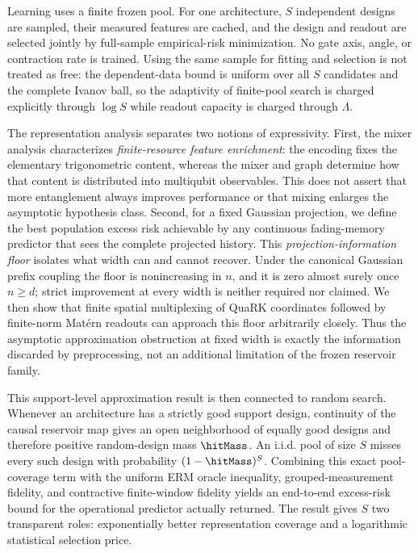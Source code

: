 Learning uses a finite frozen pool.  For one architecture, $S$ independent
designs are sampled, their measured features are cached, and the design and
readout are selected jointly by full-sample empirical-risk minimization.  No
gate axis, angle, or contraction rate is trained.  Using the same sample for
fitting and selection is not treated as free: the dependent-data bound is
uniform over all $S$ candidates and the complete Ivanov ball, so the
adaptivity of finite-pool search is charged explicitly through $\log S$ while
readout capacity is charged through $\Lambda$.

The representation analysis separates two notions of expressivity.  First,
the mixer analysis characterizes \emph{finite-resource feature enrichment}:
the encoding fixes the elementary trigonometric content, whereas the mixer and
graph determine how that content is distributed into multiqubit observables.
This does not assert that more entanglement always improves performance or
that mixing enlarges the asymptotic hypothesis class.  Second, for a fixed
Gaussian projection, we define the best population excess risk achievable
by any continuous fading-memory predictor that sees the complete projected
history.  This \emph{projection-information floor} isolates what width can and
cannot recover.  Under the canonical Gaussian prefix coupling the floor is
nonincreasing in $n$, and it is zero almost surely once $n\geq d$; strict
improvement at every width is neither required nor claimed.  We then show that
finite spatial multiplexing of QuaRK coordinates followed by finite-norm
Mat\'ern readouts can approach this floor arbitrarily closely.  Thus the
asymptotic approximation obstruction at fixed width is exactly the information
discarded by preprocessing, not an additional limitation of the frozen
reservoir family.

This support-level approximation result is then connected to random search.
Whenever an architecture has a strictly good support design, continuity of the
causal reservoir map gives an open neighborhood of equally good designs and
therefore positive random-design mass $\hitMass$.  An i.i.d. pool of
size $S$ misses every such design with probability
$(1-\hitMass)^S$.  Combining this exact pool-coverage term with the
uniform ERM oracle inequality, grouped-measurement fidelity, and contractive
finite-window fidelity yields an end-to-end excess-risk bound for the
operational predictor actually returned.  The result gives $S$ two transparent
roles: exponentially better representation coverage and a logarithmic
statistical selection price.


